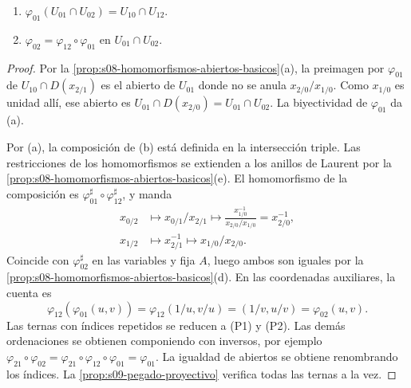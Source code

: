 \begin{prop}
\label{prop:s09-cociclo-plano}
\begin{enumerate}[label=(\alph*)]
\item $\varphi_{01}(U_{01}\cap U_{02})=U_{10}\cap U_{12}$.
\item $\varphi_{02}=\varphi_{12}\circ\varphi_{01}$ en $U_{01}\cap U_{02}$.
\end{enumerate}
\end{prop}
\begin{proof}
Por la \cref{prop:s08-homomorfismos-abiertos-basicos}(a), la preimagen por $\varphi_{01}$ de $U_{10}\cap D(x_{2/1})$ es el abierto de $U_{01}$ donde no se anula $x_{2/0}/x_{1/0}$. Como $x_{1/0}$ es unidad allí, ese abierto es $U_{01}\cap D(x_{2/0})=U_{01}\cap U_{02}$. La biyectividad de $\varphi_{01}$ da (a).

Por (a), la composición de (b) está definida en la intersección triple. Las restricciones de los homomorfismos se extienden a los anillos de Laurent por la \cref{prop:s08-homomorfismos-abiertos-basicos}(e). El homomorfismo de la composición es $\varphi_{01}^\sharp\circ\varphi_{12}^\sharp$, y manda
\[
\begin{aligned}
x_{0/2}&\longmapsto x_{0/1}/x_{2/1}
\longmapsto\frac{x_{1/0}^{-1}}{x_{2/0}/x_{1/0}}=x_{2/0}^{-1},\\
x_{1/2}&\longmapsto x_{2/1}^{-1}\longmapsto x_{1/0}/x_{2/0}.
\end{aligned}
\]
Coincide con $\varphi_{02}^\sharp$ en las variables y fija $A$, luego ambos son iguales por la \cref{prop:s08-homomorfismos-abiertos-basicos}(d). En las coordenadas auxiliares, la cuenta es
\[
\varphi_{12}(\varphi_{01}(u,v))
=\varphi_{12}(1/u,v/u)=(1/v,u/v)=\varphi_{02}(u,v).
\]
Las ternas con índices repetidos se reducen a (P1) y (P2). Las demás ordenaciones se obtienen componiendo con inversos, por ejemplo $\varphi_{21}\circ\varphi_{02}=\varphi_{21}\circ\varphi_{12}\circ\varphi_{01}=\varphi_{01}$. La igualdad de abiertos se obtiene renombrando los índices. La \cref{prop:s09-pegado-proyectivo} verifica todas las ternas a la vez.
\end{proof}

